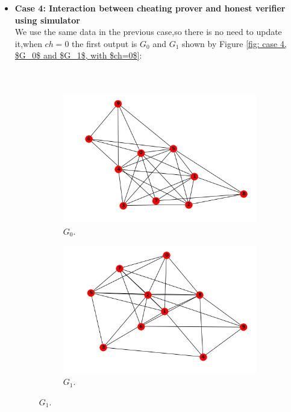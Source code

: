 \documentclass[12pt,a4paper]{article}
\begin{document}
\begin{itemize}
\item \textbf{Case 4: Interaction between cheating prover and honest verifier using simulator}\\
We use the same data in the previous case,so there is no need to update it,when $ch=0$ the first output is $G_0$ and $G_1$ shown by Figure \ref{fig: case 4, $G_0$ and $G_1$, with $ch=0$}:\\\\
\\
 \begin{figure}[h!]
	\centering\begin{subfigure}[b]{.45\linewidth}
		\includegraphics[width=\linewidth]{3-23.png}
		\caption{$G_0$.}
	\end{subfigure}
	\begin{subfigure}[b]{.45\linewidth}
		\includegraphics[width=\linewidth]{3-24.png}
		\caption{$G_1$.}
	\end{subfigure}

\end{figure}
\end{itemize}
\end{document}
